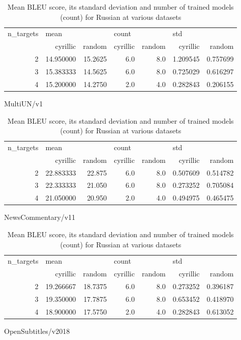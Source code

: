 \begin{table}[h]
\begin{subtable}[t]{1\linewidth}
\begin{tabular}{rrrrrrr}
\toprule
n\_targets & \multicolumn{2}{l}{mean} & \multicolumn{2}{l}{count} & \multicolumn{2}{l}{std} \\
          &   cyrillic &   random & cyrillic & random &  cyrillic &    random \\
\midrule
        2 &  14.950000 &  15.2625 &      6.0 &    8.0 &  1.209545 &  0.757699 \\
        3 &  15.383333 &  14.5625 &      6.0 &    8.0 &  0.725029 &  0.616297 \\
        4 &  15.200000 &  14.2750 &      2.0 &    4.0 &  0.282843 &  0.206155 \\
\bottomrule
\end{tabular}
\caption{MultiUN/v1}
\label{table:ru/multi_un}
\end{subtable}
\begin{subtable}[t]{1\linewidth}
\begin{tabular}{rrrrrrr}
\toprule
n\_targets & \multicolumn{2}{l}{mean} & \multicolumn{2}{l}{count} & \multicolumn{2}{l}{std} \\
          &   cyrillic &  random & cyrillic & random &  cyrillic &    random \\
\midrule
        2 &  22.883333 &  22.875 &      6.0 &    8.0 &  0.507609 &  0.514782 \\
        3 &  22.333333 &  21.050 &      6.0 &    8.0 &  0.273252 &  0.705084 \\
        4 &  21.050000 &  20.950 &      2.0 &    4.0 &  0.494975 &  0.465475 \\
\bottomrule
\end{tabular}
\caption{NewsCommentary/v11}
\label{table:ru/news_v11}
\end{subtable}
\begin{subtable}[t]{1\linewidth}
\begin{tabular}{rrrrrrr}
\toprule
n\_targets & \multicolumn{2}{l}{mean} & \multicolumn{2}{l}{count} & \multicolumn{2}{l}{std} \\
          &   cyrillic &   random & cyrillic & random &  cyrillic &    random \\
\midrule
        2 &  19.266667 &  18.7375 &      6.0 &    8.0 &  0.273252 &  0.396187 \\
        3 &  19.350000 &  17.7875 &      6.0 &    8.0 &  0.653452 &  0.418970 \\
        4 &  18.900000 &  17.5750 &      2.0 &    4.0 &  0.282843 &  0.613052 \\
\bottomrule
\end{tabular}
\caption{OpenSubtitles/v2018}
\label{table:ru/news_v11}
\end{subtable}
\caption{Mean BLEU score, its standard deviation and number of trained models (count) for Russian at various datasets}
\end{table}



